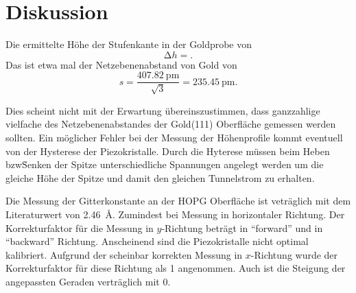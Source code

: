 \section{Diskussion}\label{sec:Diskussion}

Die ermittelte Höhe der Stufenkante in der Goldprobe von
\begin{equation*}
  \increment h = .
\end{equation*}
 Das ist etwa  mal der Netzebenenabstand von Gold von
 \begin{equation*}
   s = \frac{\SI{407.82}{\pico\meter}}{\sqrt{3}} = \SI{235.45}{\pico\meter}.
 \end{equation*}


Dies scheint nicht mit der Erwartung übereinszustimmen, dass ganzzahlige vielfache des Netzebenenabstandes der Gold(111) Oberfläche gemessen werden sollten. Ein möglicher Fehler bei der Messung der Höhenprofile
kommt eventuell von der Hysterese der Piezokristalle. Durch die Hyterese müssen beim Heben bzw\. Senken der Spitze unterschiedliche Spannungen angelegt werden
um die gleiche Höhe der Spitze und damit den gleichen Tunnelstrom zu erhalten.


Die Messung der Gitterkonstante an der HOPG Oberfläche ist veträglich mit dem Literaturwert von \SI{2.46}{\angstrom}. Zumindest bei Messung in horizontaler Richtung.
Der Korrekturfaktor für die Messung in $y$-Richtung beträgt  in \enquote{forward} und  in
\enquote{backward} Richtung. Anscheinend sind die Piezokristalle nicht optimal kalibriert.
Aufgrund der scheinbar korrekten Messung in $x$-Richtung wurde der Korrekturfaktor für diese Richtung als \num{1} angenommen.
Auch ist die Steigung der angepassten Geraden verträglich mit \num{0}.
